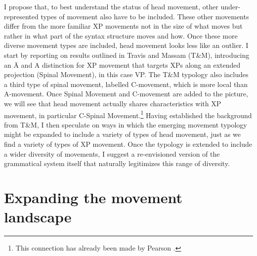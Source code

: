 \documentclass[output=paper,colorlinks,citecolor=brown,
]{langscibook}
\begin{document}
I propose that, to best understand the status of head movement, other under-represented types of movement also have to be included.  These other movements differ from the more familiar XP movements not in the size of what moves but rather in what part of the syntax structure moves and how.  Once these more diverse movement types are included, head movement looks less like an outlier.  I start by reporting on results outlined in Travis and Massam \citeyearpar{Travis:2021} (T\&M), introducing an \=A and A distinction for XP movement that targets XPs along an extended projection (Spinal Movement), in this case VP.  The T\&M typology also includes a third type of spinal movement, labelled C-movement, which is more local than A-movement.   Once Spinal Movement and C-movement are added to the picture, we will see that head movement actually shares characteristics with XP movement, in particular C-Spinal Movement.\footnote{This connection has already been made by Pearson \citeyearpar{Pearson:2000}.}  Having established the background from T\&M, I then speculate on ways in which the emerging movement typology might be expanded to include a variety of types of head movement, just as we find a variety of types of XP movement.  Once the typology is extended to include a wider diversity of movements, I suggest a re-envisioned version of the grammatical system itself that naturally legitimizes this range of diversity.
 

\section{Expanding the movement landscape}
\end{document}
